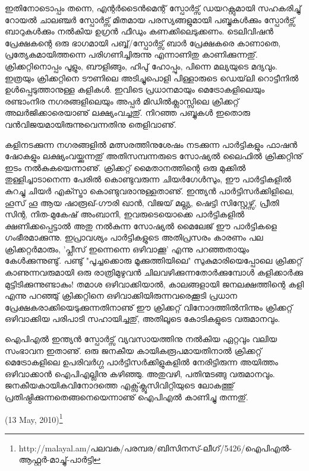 ഇതിനോടൊപ്പം തന്നെ, എന്റര്‍ടൈന്‍മെന്റ് സ്പോര്‍ട്സ് ഡയറക്റ്റുമായി സഹകരിച്ചു് റോയല്‍ ചാലഞ്ചര്‍ സ്പോര്‍ട്സ് 
മിതമായ പരസ്യങ്ങളുമായി പബ്ബുകള്‍ക്കും സ്പോര്‍ട്സ് ബാറുകള്‍ക്കും നല്‍കിയ ഉഗ്രന്‍ ഫീഡും കണക്കിലെടുക്കണം. 
ടെലിവിഷന്‍ പ്രേക്ഷകന്റെ ഒരു ഭാഗമായി പബ്ബ്/സ്പോര്‍ട്സ് ബാര്‍ പ്രേക്ഷകരെ കാണാതെ, പ്രത്യേകമായിത്തന്നെ 
പരിഗണിച്ചിരുന്നു എന്നാണിതു കാണിക്കുന്നതു്. ക്രിക്കറ്റിനൊപ്പം പൂളും, ബൗളിങ്ങും, ഹിപു് ഹോപ്പും, പിന്നെ മല്യയുടെ മദ്യവും. 
ഇത്രയും ക്രിക്കറ്റിനെ ടൗണിലെ അടിച്ചുപൊളി പിള്ളാരുടെ ഡെയ്‌ലി റൊട്ടീനില്‍ ഉള്‍പ്പെടുത്താനുള്ള കളികള്‍. ഇവിടെ 
പ്രധാനമായും മെട്രോകളിലെയും രണ്ടാംനിര നഗരങ്ങളിലെയും അപ്പര്‍ മിഡില്‍ക്ലാസ്സിലെ ക്രിക്കറ്റ് അലര്‍ജിക്കാരെയാണു് 
ലക്ഷ്യംവച്ചതു്. നിറഞ്ഞ പബ്ബുകള്‍ ഇതൊരു വന്‍വിജയമായിരുന്നുവെന്നതിനു തെളിവാണു്.


കളിനടക്കുന്ന നഗരങ്ങളില്‍ മത്സരത്തിനുശേഷം നടക്കുന്ന പാര്‍ട്ടികളും ഫാഷന്‍ ഷോകളും ലക്ഷ്യംവയ്ക്കുന്നതു് അതിസമ്പന്നരുടെ 
സോഷ്യല്‍ ലൈഫില്‍ ക്രിക്കറ്റിനു് ഇടം നല്‍കുകയെന്നാണു്. ക്രിക്കറ്റ് മൈതാനത്തിന്റെ ഒരു മുക്കില്‍ 
തുള്ളിച്ചാടാനെന്ന പേരില്‍ കൊണ്ടുവരുന്ന ചിയര്‍ഗേള്‍സും, ഈ പാര്‍ട്ടികളില്‍ കുറച്ചു ചിയര്‍ എക്സ്ട്രാ കൊണ്ടുവരാനുള്ളതാണു്. 
ഇന്ത്യന്‍ പാര്‍ട്ടിസര്‍ക്കിളിലെ, ഹൂസ് ഹൂ ആയ ഷാരൂഖ്-ഗൗരി ഖാന്‍, വിജയ് മല്ല്യ, ഷെട്ടി സിസ്റ്റേഴ്സ്, പ്രീതി സിന്റ, 
നിത-മുകേഷ് അംബാനി, ഇവരുടെയൊക്കെ പാര്‍ട്ടികളില്‍ ക്ഷണിക്കപ്പെട്ടാല്‍ അതു നല്‍കുന്ന സോഷ്യല്‍ മൈലേജ് ഈ 
പാര്‍ട്ടികളെ ഗംഭീരമാക്കുന്നു. ഇപ്രാവശ്യം പാര്‍ട്ടികളുടെ അതിപ്രസരം കാരണം പല ക്രിക്കറ്റര്‍മാരും, 'പ്ലീസ് ഇന്നെന്നെ 
ഒഴിവാക്കൂ' എന്നു പറഞ്ഞതായും കേള്‍ക്കുന്നുണ്ടു്. പണ്ടു് "പൂച്ചക്കൊരു മൂക്കുത്തിയിലെ" സുകുമാരിയെപ്പോലെ ക്രിക്കറ്റ് 
കാണുന്നവരുമായി ഒരു രാത്രിമുഴുവന്‍ ചിലവഴിക്കുന്നതോര്‍ക്കുമ്പോള്‍ കളിക്കാര്‍ക്കു മുട്ടിടിക്കുന്നുണ്ടാകും! തമാശ ഒഴിവാക്കിയാല്‍, 
കാലങ്ങളായി ജനലക്ഷത്തിന്റെ കളി എന്നു പറഞ്ഞു് ക്രിക്കറ്റിനെ ഒഴിവാക്കിയിരുന്നവരെക്കൂടി പ്രധാന 
പ്രേക്ഷകരാക്കിയെടുക്കുന്നതിനാണു് ഈ ക്രിക്കറ്റ് വിനോദത്തില്‍നിന്നും ക്രിക്കറ്റ് ഒഴിവാക്കിയ പരിപാടി സഹായിച്ചതു്, 
അതിലൂടെ കോടികളുടെ വരുമാനവും.

ഐപിഎല്‍ ഇന്ത്യന്‍ സ്പോര്‍ട്സ് വ്യവസായത്തിനു നല്‍കിയ ഏറ്റവും വലിയ സംഭാവന ഇതാണു്. ഒരു ജനകീയ കായികരൂപമായതിനാല്‍ 
ക്രിക്കറ്റ് മെട്രോകളിലെ ഉപരിവര്‍ഗ്ഗ പാര്‍ട്ടിസര്‍ക്കിളുകളില്‍ നേരിട്ടിരുന്ന അയിത്തം ഒഴിവാക്കാന്‍ 
ഐപിഎല്ലിനു കഴിഞ്ഞു. അതുവഴി, പതിന്മടങ്ങു വരുമാനവും. ജനകീയകായികവിനോദത്തെ എക്സ്‌ക്ലൂസിവിറ്റിയുടെ ലോകത്തു് 
പ്രതിഷ്ഠിക്കുന്നതെങ്ങനെയെന്നാണു് ഐപിഎല്‍ കാണിച്ചു തന്നതു്.

\hspace*{2em}(13 May, 2010)\footnote{http://malayal.am/പലവക/പരമ്പര/ബിസിനസ്-ലീഗ്/5426/ഐപിഎല്‍-ആഫ്റ്റര്‍-മാച്ചു്-പാര്‍ട്ടി}

\newpage
